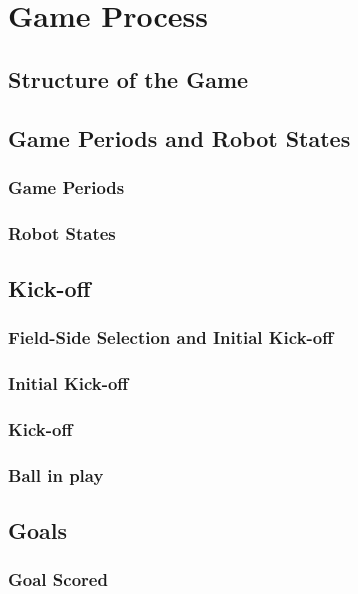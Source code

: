 \section{Game Process}
\label{sec:game}

\subsection{Structure of the Game}
\label{sec:game_structure}

\subsection{Game Periods and Robot States}
\label{sec:game_states}
\subsubsection{Game Periods}
\subsubsection{Robot States}

\subsection{Kick-off}
\subsubsection{Field-Side Selection and Initial Kick-off}
\subsubsection{Initial Kick-off}
\subsubsection{Kick-off}
\label{sec:kick-off}
\subsubsection{Ball in play}

\subsection{Goals}
\subsubsection{Goal Scored}
\label{sec:goal}

